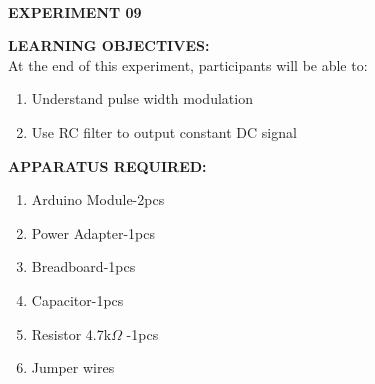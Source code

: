 \documentclass[12pt,a4paper]{article}
\begin{document}
\begin{center}

\textbf{\large \\EXPERIMENT 09 }\\[6pt]
\end{center}

\textbf{\large LEARNING OBJECTIVES:}\\[3pt]
At the end of this experiment, participants will be able to:\vspace{-6mm}\begin{enumerate}
 \setlength\itemsep{-0.3em}
\item Understand pulse width modulation \\
\item Use RC filter to output constant DC signal \\

\end{enumerate}
\textbf{\large APPARATUS REQUIRED:}\\
\vspace{-3mm}
\begin{enumerate}
 \setlength\itemsep{-0.3em}
\item Arduino Module-2pcs \\
\item Power Adapter-1pcs\\
\item Breadboard-1pcs\\
\item Capacitor-1pcs\\
\item Resistor 4.7k$\Omega$ -1pcs\\
\item Jumper wires\\

\end{enumerate}
\end{document}
